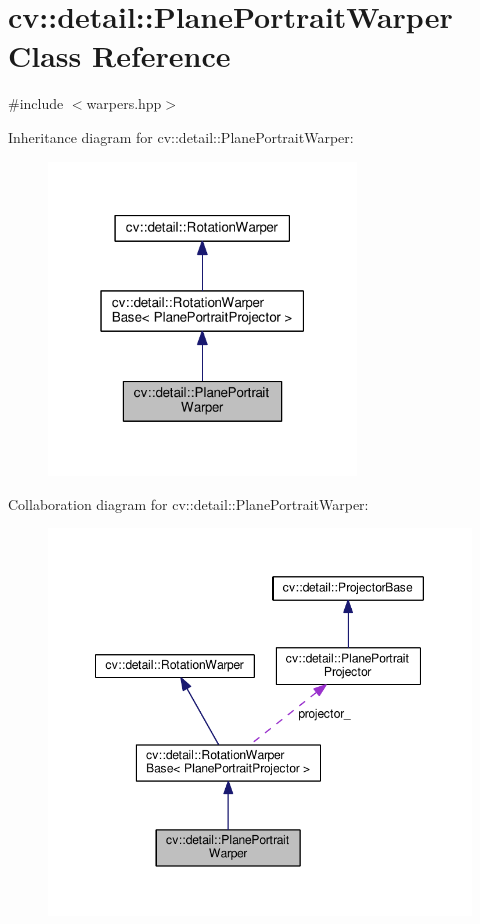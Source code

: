 \hypertarget{classcv_1_1detail_1_1PlanePortraitWarper}{\section{cv\-:\-:detail\-:\-:Plane\-Portrait\-Warper Class Reference}
\label{classcv_1_1detail_1_1PlanePortraitWarper}
}


{\ttfamily \#include $<$warpers.\-hpp$>$}



Inheritance diagram for cv\-:\-:detail\-:\-:Plane\-Portrait\-Warper\-:\nopagebreak
\begin{figure}[H]
\begin{center}
\leavevmode
\includegraphics[width=232pt]{classcv_1_1detail_1_1PlanePortraitWarper__inherit__graph}
\end{center}
\end{figure}


Collaboration diagram for cv\-:\-:detail\-:\-:Plane\-Portrait\-Warper\-:\nopagebreak
\begin{figure}[H]
\begin{center}
\leavevmode
\includegraphics[width=350pt]{classcv_1_1detail_1_1PlanePortraitWarper__coll__graph}
\end{center}
\end{figure}
